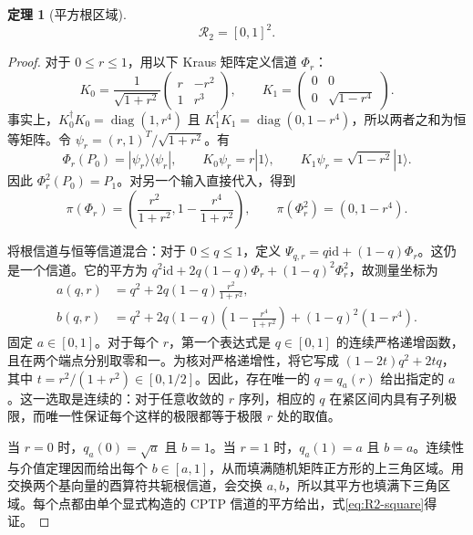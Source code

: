\documentclass[UTF8,11pt,a4paper,fontset=fandol]{ctexart}
\newtheorem{theorem}{定理}[section]
\theoremstyle{definition}
\theoremstyle{remark}
\DeclareMathOperator{\diag}{diag}
\newcommand{\id}{\mathrm{id}}
\begin{document}
\begin{theorem}[平方根区域]\label{thm:square-roots}
\begin{equation}\label{eq:R2-square}
 \mathcal R_2=[0,1]^2.
\end{equation}
\end{theorem}
\begin{proof}
对于 \(0\leq r\leq1\)，用以下 Kraus 矩阵定义信道 \(\Phi_r\)：
\begin{equation}\label{eq:root-kraus}
 K_0=\frac1{\sqrt{1+r^2}}
 \begin{pmatrix}r&-r^2\\1&r^3\end{pmatrix},\qquad
 K_1=\begin{pmatrix}0&0\\0&\sqrt{1-r^4}\end{pmatrix}.
\end{equation}
事实上，\(K_0^\dagger K_0=\diag(1,r^4)\) 且 \(K_1^\dagger K_1=\diag(0,1-r^4)\)，所以两者之和为恒等矩阵。令
\(\psi_r=(r,1)^T/\sqrt{1+r^2}\)。有
\[
 \Phi_r(P_0)=|\psi_r\rangle\langle\psi_r|,\qquad
 K_0\psi_r=r|1\rangle,\qquad K_1\psi_r=\sqrt{1-r^2}|1\rangle.
\]
因此 \(\Phi_r^2(P_0)=P_1\)。对另一个输入直接代入，得到
\begin{equation}\label{eq:root-readouts}
 \pi(\Phi_r)=\left(\frac{r^2}{1+r^2},1-\frac{r^4}{1+r^2}\right),\qquad
 \pi(\Phi_r^2)=(0,1-r^4).
\end{equation}

将根信道与恒等信道混合：对于 \(0\leq q\leq1\)，定义
\(\Psi_{q,r}=q\id+(1-q)\Phi_r\)。这仍是一个信道。它的平方为
\(q^2\id+2q(1-q)\Phi_r+(1-q)^2\Phi_r^2\)，故测量坐标为
\begin{equation}\label{eq:root-square-formula}
 \begin{aligned}
 a(q,r)&=q^2+2q(1-q)\frac{r^2}{1+r^2},\\
 b(q,r)&=q^2+2q(1-q)\left(1-\frac{r^4}{1+r^2}\right)
            +(1-q)^2(1-r^4).
 \end{aligned}
\end{equation}
固定 \(a\in[0,1]\)。对于每个 \(r\)，第一个表达式是 \(q\in[0,1]\) 的连续严格递增函数，且在两个端点分别取零和一。为核对严格递增性，将它写成 \((1-2t)q^2+2tq\)，其中 \(t=r^2/(1+r^2)\in[0,1/2]\)。因此，存在唯一的 \(q=q_a(r)\) 给出指定的 \(a\)。这一选取是连续的：对于任意收敛的 \(r\) 序列，相应的 \(q\) 在紧区间内具有子列极限，而唯一性保证每个这样的极限都等于极限 \(r\) 处的取值。

当 \(r=0\) 时，\(q_a(0)=\sqrt a\) 且 \(b=1\)。当 \(r=1\) 时，\(q_a(1)=a\) 且 \(b=a\)。连续性与介值定理因而给出每个 \(b\in[a,1]\)，从而填满随机矩阵正方形的上三角区域。用交换两个基向量的酉算符共轭根信道，会交换 \(a,b\)，所以其平方也填满下三角区域。每个点都由单个显式构造的 CPTP 信道的平方给出，式\eqref{eq:R2-square}得证。
\end{proof}
\end{document}
